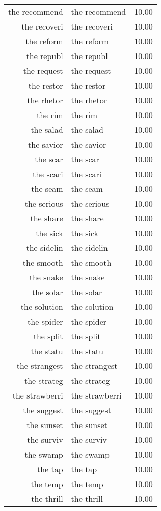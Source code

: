 \begin{table}[ht]
\begin{tabular}{rlr}
  the recommend & the recommend & 10.00 \\ 
  the recoveri & the recoveri & 10.00 \\ 
  the reform & the reform & 10.00 \\ 
  the republ & the republ & 10.00 \\ 
  the request & the request & 10.00 \\ 
  the restor & the restor & 10.00 \\ 
  the rhetor & the rhetor & 10.00 \\ 
  the rim & the rim & 10.00 \\ 
  the salad & the salad & 10.00 \\ 
  the savior & the savior & 10.00 \\ 
  the scar & the scar & 10.00 \\ 
  the scari & the scari & 10.00 \\ 
  the seam & the seam & 10.00 \\ 
  the serious & the serious & 10.00 \\ 
  the share & the share & 10.00 \\ 
  the sick & the sick & 10.00 \\ 
  the sidelin & the sidelin & 10.00 \\ 
  the smooth & the smooth & 10.00 \\ 
  the snake & the snake & 10.00 \\ 
  the solar & the solar & 10.00 \\ 
  the solution & the solution & 10.00 \\ 
  the spider & the spider & 10.00 \\ 
  the split & the split & 10.00 \\ 
  the statu & the statu & 10.00 \\ 
  the strangest & the strangest & 10.00 \\ 
  the strateg & the strateg & 10.00 \\ 
  the strawberri & the strawberri & 10.00 \\ 
  the suggest & the suggest & 10.00 \\ 
  the sunset & the sunset & 10.00 \\ 
  the surviv & the surviv & 10.00 \\ 
  the swamp & the swamp & 10.00 \\ 
  the tap & the tap & 10.00 \\ 
  the temp & the temp & 10.00 \\ 
  the thrill & the thrill & 10.00 \\ 

\end{tabular}
\end{table}
